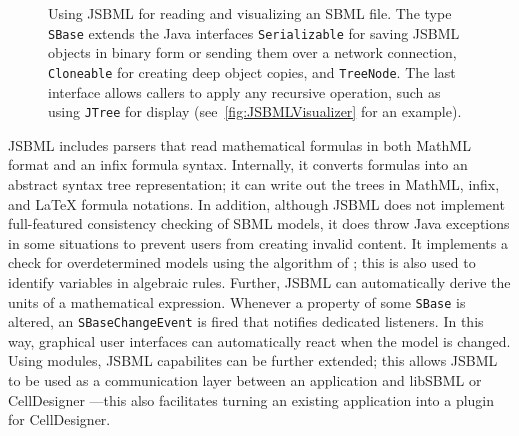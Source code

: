 \documentclass{bioinfo}
\begin{document}
\begin{methods}
\begin{figure}
{{{{\begin{minipage}[t][5.7cm][c]{.55\textwidth}
          
        \end{minipage}
      }
    }
  }\hspace{1cm}
}
\caption[Using JSBML for reading and visualizing an SBML file using
JSBML]{Using JSBML for reading and visualizing an SBML file. The type
\texttt{SBase} extends the Java interfaces \texttt{Serializable} for saving
JSBML objects in binary form or sending them over a network connection,
\texttt{Cloneable} for creating deep object copies, and \texttt{TreeNode}.
The last interface allows callers to apply any recursive operation, such as
using \texttt{JTree} for display (see~\ref{fig:JSBMLVisualizer} for an
example).}
\label{fig:JSBML}
\end{figure}

JSBML includes parsers that read mathematical formulas in both MathML
format and an infix formula syntax.  Internally, it converts formulas
into an abstract syntax tree representation; it can write out the
trees in MathML, infix, and \LaTeX{} formula notations.
In addition, although JSBML does not implement full-featured
consistency checking of SBML models, it does throw Java exceptions in some
situations to prevent users from creating invalid content.
It implements a check for overdetermined models
using the algorithm of \citet{Hopcroft1973}; this is 
also used to identify variables in algebraic rules. Further, JSBML can
automatically derive the units of a mathematical expression.
Whenever a property of some \texttt{SBase} is altered, an
\texttt{SBaseChangeEvent} is fired that notifies dedicated listeners. In this
way, graphical user interfaces can automatically react when the model is changed.
Using modules, JSBML capabilites can be further
extended; this allows JSBML to be used as a communication layer
between an application and libSBML or CellDesigner
\citep{Funahashi2003}---this also facilitates turning an existing application
into a plugin for CellDesigner.
\end{methods}
\end{document}
